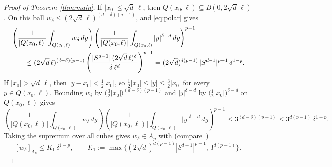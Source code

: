 \documentclass[12pt]{article}
\begin{document}
\begin{proof}[Proof of Theorem~\ref{thm:main}]
If $|x_0| \le \sqrt{d}\,\ell$, then $Q(x_0,\ell) \subseteq B(0, 2\sqrt{d}\,\ell)$. On this ball $w_\delta \le (2\sqrt{d}\,\ell)^{(d-\delta)(p-1)}$, and \eqref{eq:polar} gives
\begin{align*}
  \MoveEqLeft \left( \frac{1}{|Q(x_0,\ell)|} \int_{Q(x_0,\ell)} w_\delta\,dy \right) \left( \frac{1}{|Q(x_0,\ell)|} \int_{Q(x_0,\ell)} |y|^{\delta-d}\,dy \right)^{p-1} \\
  &\le (2\sqrt{d}\,\ell)^{(d-\delta)(p-1)} \left( \frac{|S^{d-1}|\,(2\sqrt{d}\,\ell)^{\delta}}{\delta\,\ell^d} \right)^{p-1} = (2\sqrt{d})^{d(p-1)}\, |S^{d-1}|^{p-1}\, \delta^{1-p}.
\end{align*}
If $|x_0| > \sqrt{d}\,\ell$, then $|y - x_0| < \frac{1}{2}|x_0|$, so $\frac{1}{2}|x_0| \le |y| \le \frac{3}{2}|x_0|$ for every $y \in Q(x_0,\ell)$. Bounding $w_\delta$ by $\big(\tfrac{3}{2}|x_0|\big)^{(d-\delta)(p-1)}$ and $|y|^{\delta-d}$ by $\big(\tfrac{1}{2}|x_0|\big)^{\delta-d}$ on $Q(x_0,\ell)$ gives
\[
  \left( \frac{1}{|Q(x_0,\ell)|} \int_{Q(x_0,\ell)} w_\delta\,dy \right) \left( \frac{1}{|Q(x_0,\ell)|} \int_{Q(x_0,\ell)} |y|^{\delta-d}\,dy \right)^{p-1} \le 3^{(d-\delta)(p-1)} \le 3^{d(p-1)}\, \delta^{1-p}.
\]
Taking the supremum over all cubes gives $w_\delta \in A_p$ with (compare~\cite[Lemma~1.4]{Buckley1993})
\begin{equation}\label{eq:wdelta}
  [w_\delta]_{A_p} \le K_1\, \delta^{1-p}, \qquad K_1 := \max\{(2\sqrt{d})^{d(p-1)}|S^{d-1}|^{p-1},\, 3^{d(p-1)}\}.
\end{equation}


\end{proof}
\end{document}
